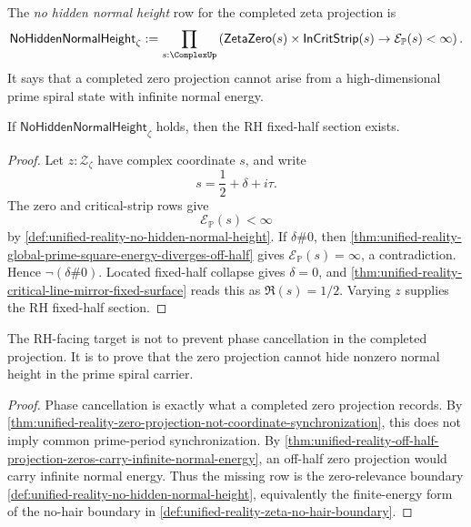 \begin{definition}
\label{def:unified-reality-no-hidden-normal-height}
The \emph{no hidden normal height} row for the completed zeta projection
is
$$
\mathsf{NoHiddenNormalHeight}_{\zeta}
:=
\prod_{s:\ComplexUp}
\left(
\mathsf{ZetaZero}(s)
\times
\mathsf{InCritStrip}(s)
\to
\mathcal E_{\mathbb P}(s)<\infty
\right).
$$
It says that a completed zero projection cannot arise from a
high-dimensional prime spiral state with infinite normal energy.
\end{definition}

\begin{theorem}
\label{thm:unified-reality-no-hidden-normal-height-conditionally-sufficient}
If $\mathsf{NoHiddenNormalHeight}_{\zeta}$ holds, then the RH fixed-half
section exists.
\end{theorem}

\begin{proof}
Let $z:\mathcal Z_{\zeta}$ have complex coordinate $s$, and write
$$
s=\frac12+\delta+i\tau.
$$
The zero and critical-strip rows give
$$
\mathcal E_{\mathbb P}(s)<\infty
$$
by
\autoref{def:unified-reality-no-hidden-normal-height}.  If
$\delta\#0$, then
\autoref{thm:unified-reality-global-prime-square-energy-diverges-off-half}
gives $\mathcal E_{\mathbb P}(s)=\infty$, a contradiction.  Hence
$\neg(\delta\#0)$.  Located fixed-half collapse gives $\delta=0$, and
\autoref{thm:unified-reality-critical-line-mirror-fixed-surface} reads
this as $\Re(s)=1/2$.  Varying $z$ supplies the RH fixed-half section.
\end{proof}

\begin{corollary}
\label{cor:unified-reality-projection-zero-needs-zero-relevance-boundary}
The RH-facing target is not to prevent phase cancellation in the
completed projection.  It is to prove that the zero projection cannot
hide nonzero normal height in the prime spiral carrier.
\end{corollary}

\begin{proof}
Phase cancellation is exactly what a completed zero projection records.
By
\autoref{thm:unified-reality-zero-projection-not-coordinate-synchronization},
this does not imply common prime-period synchronization.  By
\autoref{thm:unified-reality-off-half-projection-zeros-carry-infinite-normal-energy},
an off-half zero projection would carry infinite normal energy.  Thus the
missing row is the zero-relevance boundary
\autoref{def:unified-reality-no-hidden-normal-height}, equivalently the
finite-energy form of the no-hair boundary in
\autoref{def:unified-reality-zeta-no-hair-boundary}.
\end{proof}

